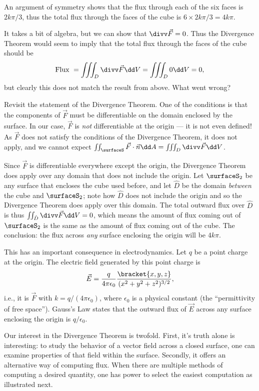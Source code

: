 \begin{example}
An argument of symmetry shows that the flux through each of the six faces is $2k\pi/3$, thus the total flux through the faces of the cube is $6\times2k\pi/3 = 4k\pi$.

It takes a bit of algebra, but we can show that $\divv\vec F = 0$. Thus the Divergence Theorem would seem to imply that the total flux through the faces of the cube should be 
\[\text{Flux }=\iiint_D \divv \vec F\dd V = \iiint_D 0\dd V = 0,\]
but clearly this does not match the result from above. What went wrong?

Revisit the statement of the Divergence Theorem. One of the conditions is that the components of $\vec F$ must be differentiable on the domain enclosed by the surface. In our case, $\vec F$ is \emph{not} differentiable at the origin --- it is not even defined! As $\vec F$ does not satisfy the conditions of the Divergence Theorem, it does not apply, and we cannot expect $\iint_\surfaceS \vec F\cdot\vec n\dd A = \iiint_D \divv\vec F\dd V$.

Since $\vec F$ is differentiable everywhere except the origin, the Divergence Theorem does apply over any domain that does not include the origin. Let $\surfaceS_2$ be any surface that encloses the cube used before, and let $\hat D$ be the domain \emph{between} the cube and $\surfaceS_2$; note how $\hat D$ does not include the origin and so the Divergence Theorem does apply over this domain. The total outward flux over $\hat D$ is thus $\iint_{\hat D}\divv \vec F\dd V = 0$, which means the amount of flux coming out of $\surfaceS_2$ is the same as the amount of flux coming out of the cube. The conclusion: the flux across \emph{any} surface enclosing the origin will be $4k\pi$. 

This has an important consequence in electrodynamics. Let $q$ be a point charge at the origin. The electric field generated by this point charge is 
\[\vec E = \frac{q}{4\pi \epsilon_0}\frac{\bracket{x,y,z}}{(x^2+y^2+z^2)^{3/2}},\]
i.e., it is $\vec F$ with $k = q/(4\pi \epsilon_0)$, where $\epsilon_0$ is a physical constant (the ``permittivity of free space''). Gauss's Law states that the outward flux of $\vec E$ across any surface enclosing the origin is $q/\epsilon_0$.
\end{example}

Our interest in the Divergence Theorem is twofold. First, it's truth alone is interesting: to study the behavior of a vector field across a closed surface, one can examine properties of that field within the surface. Secondly, it offers an alternative way of computing flux. When there are multiple methods of computing a desired quantity, one has power to select the easiest computation as illustrated next.

